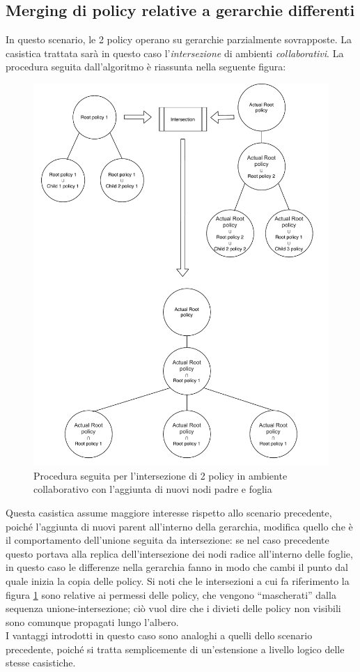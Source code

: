 \documentclass[12pt,a4paper,twoside]{book}
\begin{document}
\subsection{Merging di policy relative a gerarchie differenti}
In questo scenario, le 2 policy operano su gerarchie parzialmente sovrapposte. La casistica trattata sarà in questo caso l'\textit{intersezione} di ambienti \textit{collaborativi}. La procedura seguita dall'algoritmo è riassunta nella seguente figura:
\begin{figure}[H]
\centering
\includegraphics[scale=.5]{../immagini/treeNewNodesExample.pdf}
\caption{Procedura seguita per l'intersezione di 2 policy in ambiente collaborativo con l'aggiunta di nuovi nodi padre e foglia}
\label{treeNewNodeExample}
\end{figure}
Questa casistica assume maggiore interesse rispetto allo scenario precedente, poiché l'aggiunta di nuovi parent all'interno della gerarchia, modifica quello che è il comportamento dell'unione seguita da intersezione: se nel caso precedente questo portava alla replica dell'intersezione dei nodi radice all'interno delle foglie, in questo caso le differenze nella gerarchia fanno in modo che cambi il punto dal quale inizia la copia delle policy. Si noti che le intersezioni a cui fa riferimento la figura \ref{treeNewNodeExample} sono relative ai permessi delle policy, che vengono ``mascherati'' dalla sequenza unione-intersezione; ciò vuol dire che i divieti delle policy non visibili sono comunque propagati lungo l'albero.\\
I vantaggi introdotti in questo caso sono analoghi a quelli dello scenario precedente, poiché si tratta semplicemente di un'estensione a livello logico delle stesse casistiche. 
\end{document}
